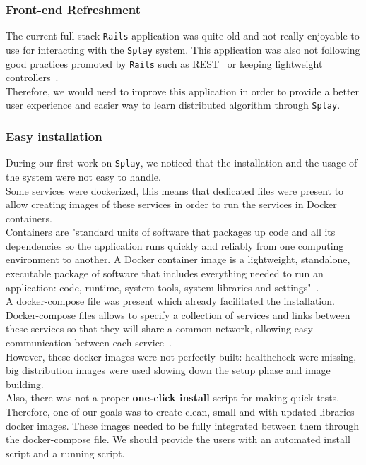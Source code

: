 \documentclass{eplmastersthesis}
\begin{document}
        \subsubsection{Front-end Refreshment}

          The current full-stack \texttt{Rails} application was quite old and not
          really enjoyable to use for interacting with the \texttt{Splay}
          system. This application was also not following good practices
          promoted by \texttt{Rails} such as REST~\cite{rest} or keeping lightweight
          controllers~\cite{fatmod}.\\
          Therefore, we would need to improve this application in order to
          provide a better user experience and easier way to learn distributed
          algorithm through \texttt{Splay}.

        \subsubsection{Easy installation}

          During our first work on \texttt{Splay}, we noticed that the
          installation and the usage of the system were not easy to handle.\\

          Some services were dockerized, this means that dedicated files
          were present to allow creating images of these services in order
          to run the services in Docker containers.\\
          Containers are "standard units of software that packages up code and
          all its dependencies so the application runs quickly and reliably
          from one computing environment to another. A Docker container image
          is a lightweight, standalone, executable package of software that
          includes everything needed to run an application: code, runtime,
          system tools, system libraries and settings"~\cite{dockercontainer}.\\
          A docker-compose file was present which already facilitated the
          installation. Docker-compose files allows to specify a
          collection of services and links between these services so that
          they will share a common network, allowing easy communication
          between each service~\cite{dockercompose}.\\

          However, these docker images were not perfectly built: healthcheck
          were missing, big distribution images were used slowing down the %
          setup phase and image building.\\
          Also, there was not a proper \textbf{one-click install} script for
          making quick tests.\\
          Therefore, one of our goals was to create clean, small and with
          updated libraries docker images. These images needed to be fully
          integrated between them through the docker-compose file. We should
          provide the users with an automated install script and a running
          script.
\end{document}
